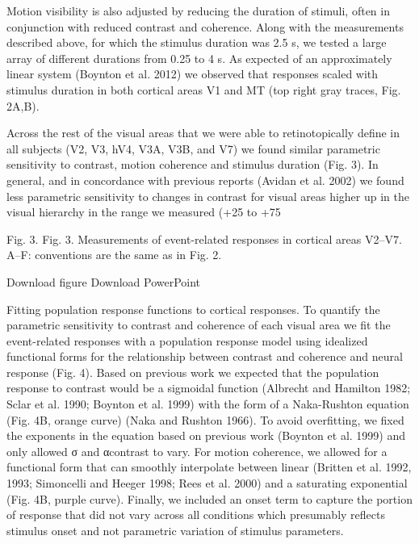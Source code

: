 \documentclass{report}
\begin{document}
Motion visibility is also adjusted by reducing the duration of stimuli, often in conjunction with reduced contrast and coherence. Along with the measurements described above, for which the stimulus duration was 2.5 s, we tested a large array of different durations from 0.25 to 4 s. As expected of an approximately linear system (Boynton et al. 2012) we observed that responses scaled with stimulus duration in both cortical areas V1 and MT (top right gray traces, Fig. 2A,B).

Across the rest of the visual areas that we were able to retinotopically define in all subjects (V2, V3, hV4, V3A, V3B, and V7) we found similar parametric sensitivity to contrast, motion coherence and stimulus duration (Fig. 3). In general, and in concordance with previous reports (Avidan et al. 2002) we found less parametric sensitivity to changes in contrast for visual areas higher up in the visual hierarchy in the range we measured (+25 to +75%

Fig. 3.
Fig. 3.
Measurements of event-related responses in cortical areas V2–V7. A–F: conventions are the same as in Fig. 2.

Download figure Download PowerPoint

Fitting population response functions to cortical responses.
To quantify the parametric sensitivity to contrast and coherence of each visual area we fit the event-related responses with a population response model using idealized functional forms for the relationship between contrast and coherence and neural response (Fig. 4). Based on previous work we expected that the population response to contrast would be a sigmoidal function (Albrecht and Hamilton 1982; Sclar et al. 1990; Boynton et al. 1999) with the form of a Naka-Rushton equation (Fig. 4B, orange curve) (Naka and Rushton 1966). To avoid overfitting, we fixed the exponents in the equation based on previous work (Boynton et al. 1999) and only allowed σ and αcontrast to vary. For motion coherence, we allowed for a functional form that can smoothly interpolate between linear (Britten et al. 1992, 1993; Simoncelli and Heeger 1998; Rees et al. 2000) and a saturating exponential (Fig. 4B, purple curve). Finally, we included an onset term to capture the portion of response that did not vary across all conditions which presumably reflects stimulus onset and not parametric variation of stimulus parameters.
\end{document}

